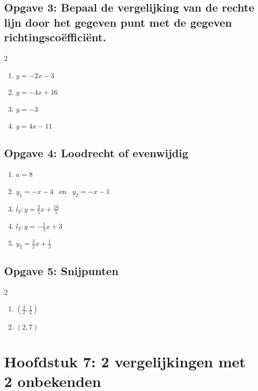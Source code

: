 \subsection*{Opgave 3: Bepaal de vergelijking van de rechte lijn door het gegeven punt met de gegeven richtingsco\"effici\"ent.}
\begin{multicols}{2}
\begin{enumerate}[label=\alph*)]
    \item $y = -2x - 3$
    \item $y = -4x + 16$
    \item $y = -3$
    \item $y = 4x - 11$
\end{enumerate}
\end{multicols}

\subsection*{Opgave 4: Loodrecht of evenwijdig}
\begin{enumerate}[label=\alph*)]
    \item $a = 8$
    \item $y_1 = -x - 4$ \ en \ $y_2 = -x - 1$
    \item $l_2: y = \frac{2}{5}x + \frac{16}{5}$
    \item $l_2: y = -\frac{1}{3}x + 3$
    \item $y_2 = \frac{3}{2}x + \frac{1}{2}$
\end{enumerate}

\subsection*{Opgave 5: Snijpunten}
\begin{multicols}{2}
\begin{enumerate}[label=\alph*)]
    \item $\left(\frac{3}{2}, \frac{1}{2}\right)$
    \item $(2, 7)$
\end{enumerate}
\end{multicols}



\newpage
\section{Hoofdstuk 7: 2 vergelijkingen met 2 onbekenden}
